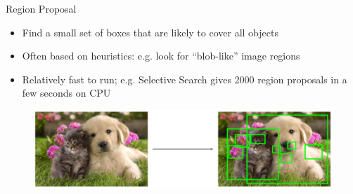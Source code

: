 \begin{frame}{Region Proposal}
\begin{itemize}
    \item Find a small set of boxes that are likely to cover all objects
    \item Often based on heuristics: e.g. look for “blob-like” image regions
    \item Relatively fast to run; e.g. Selective Search gives 2000 region proposals in a few seconds on CPU

\end{itemize}
\begin{figure}
\centering
\includegraphics[width=1.0\textwidth,height=1.0\textheight,keepaspectratio]{images/obj-det/object_17.png}
\end{figure}
    
\end{frame}